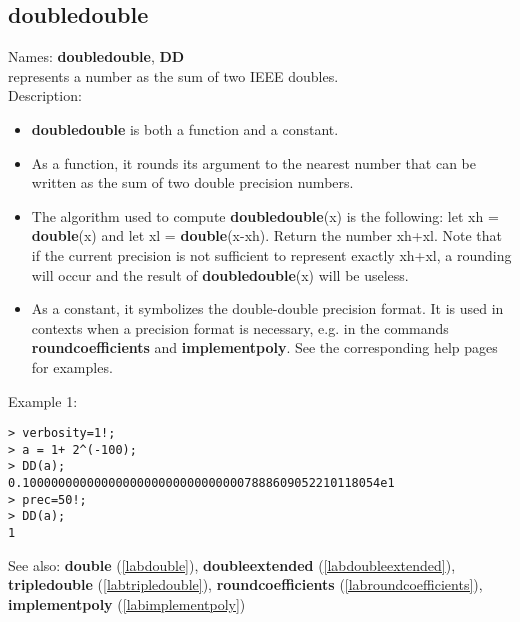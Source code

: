 \subsection{doubledouble}
\label{labdoubledouble}
\noindent Names: \textbf{doubledouble}, \textbf{DD}\\
represents a number as the sum of two IEEE doubles.\\

\noindent Description: \begin{itemize}

\item \textbf{doubledouble} is both a function and a constant.

\item As a function, it rounds its argument to the nearest number that can be written
   as the sum of two double precision numbers.

\item The algorithm used to compute \textbf{doubledouble}(x) is the following: let xh = \textbf{double}(x)
   and let xl = \textbf{double}(x-xh). Return the number xh+xl. Note that if the current 
   precision is not sufficient to represent exactly xh+xl, a rounding will occur
   and the result of \textbf{doubledouble}(x) will be useless.

\item As a constant, it symbolizes the double-double precision format. It is used in 
   contexts when a precision format is necessary, e.g. in the commands 
   \textbf{roundcoefficients} and \textbf{implementpoly}.
   See the corresponding help pages for examples.
\end{itemize}
\noindent Example 1: 
\begin{center}\begin{minipage}{15cm}\begin{Verbatim}[frame=single]
> verbosity=1!;
> a = 1+ 2^(-100);
> DD(a);
0.10000000000000000000000000000007888609052210118054e1
> prec=50!;
> DD(a);
1
\end{Verbatim}
\end{minipage}\end{center}
See also: \textbf{double} (\ref{labdouble}), \textbf{doubleextended} (\ref{labdoubleextended}), \textbf{tripledouble} (\ref{labtripledouble}), \textbf{roundcoefficients} (\ref{labroundcoefficients}), \textbf{implementpoly} (\ref{labimplementpoly})
